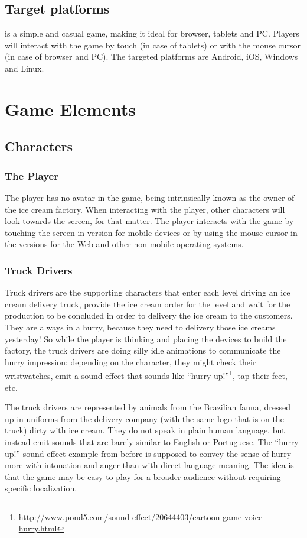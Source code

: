 \documentclass[a4paper]{scrartcl}
\begin{document}
	\subsection{Target platforms}
	    \gamename is a simple and casual game, making it ideal for browser, tablets
	    and PC. Players will interact with the game by touch (in case of tablets) or with the mouse cursor (in case of browser and PC). The targeted platforms are Android, iOS, Windows and Linux.
		
\section{Game Elements}

	\subsection{Characters}

		\subsubsection{The Player}
			The player has no avatar in the game, being intrinsically known as the owner of the ice cream factory. When interacting with the player, other characters will look towards the screen, for that matter. The player interacts with the game by touching the screen in version for mobile devices or by using the mouse cursor in the versions for the Web and other non-mobile operating systems.

		\subsubsection{Truck Drivers}
			Truck drivers are the supporting characters that enter each level driving an ice cream delivery truck, provide the ice cream order for the level and wait for the production to be concluded in order to delivery the ice cream to the customers. They are always in a hurry, because they need to delivery those ice creams yesterday! So while the player is thinking and placing the devices to build the factory, the truck drivers are doing silly idle animations to communicate the hurry impression: depending on the character, they might check their wristwatches, emit a sound effect that sounds like ``hurry up!''\footnote{\url{http://www.pond5.com/sound-effect/20644403/cartoon-game-voice-hurry.html}}, tap their feet, etc.
			
			The truck drivers are represented by animals from the Brazilian fauna, dressed up in uniforms from the delivery company (with the same logo that is on the truck) dirty with ice cream. They do not speak in plain human language, but instead emit sounds that are barely similar to English or Portuguese. The ``hurry up!'' sound effect example from before is supposed to convey the sense of hurry more with intonation and anger than with direct language meaning. The idea is that the game may be easy to play for a broader audience without requiring specific localization.
			
\end{document}
